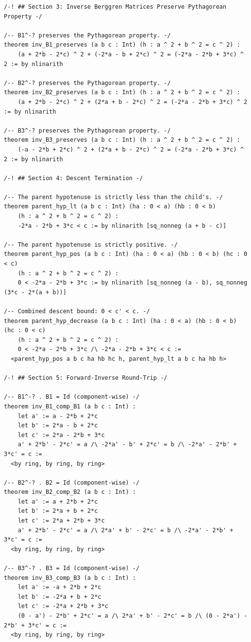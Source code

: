 \documentclass[11pt,twoside,openright]{book}
\theoremstyle{definition}
\theoremstyle{remark}
\begin{document}
\begin{lstlisting}[style=lean]
/-! ## Section 3: Inverse Berggren Matrices Preserve Pythagorean Property -/

/-- B1^-? preserves the Pythagorean property. -/
theorem inv_B1_preserves (a b c : Int) (h : a ^ 2 + b ^ 2 = c ^ 2) :
    (a + 2*b - 2*c) ^ 2 + (-2*a - b + 2*c) ^ 2 = (-2*a - 2*b + 3*c) ^ 2 := by nlinarith

/-- B2^-? preserves the Pythagorean property. -/
theorem inv_B2_preserves (a b c : Int) (h : a ^ 2 + b ^ 2 = c ^ 2) :
    (a + 2*b - 2*c) ^ 2 + (2*a + b - 2*c) ^ 2 = (-2*a - 2*b + 3*c) ^ 2 := by nlinarith

/-- B3^-? preserves the Pythagorean property. -/
theorem inv_B3_preserves (a b c : Int) (h : a ^ 2 + b ^ 2 = c ^ 2) :
    (-a - 2*b + 2*c) ^ 2 + (2*a + b - 2*c) ^ 2 = (-2*a - 2*b + 3*c) ^ 2 := by nlinarith

/-! ## Section 4: Descent Termination -/

/-- The parent hypotenuse is strictly less than the child's. -/
theorem parent_hyp_lt (a b c : Int) (ha : 0 < a) (hb : 0 < b)
    (h : a ^ 2 + b ^ 2 = c ^ 2) :
    -2*a - 2*b + 3*c < c := by nlinarith [sq_nonneg (a + b - c)]

/-- The parent hypotenuse is strictly positive. -/
theorem parent_hyp_pos (a b c : Int) (ha : 0 < a) (hb : 0 < b) (hc : 0 < c)
    (h : a ^ 2 + b ^ 2 = c ^ 2) :
    0 < -2*a - 2*b + 3*c := by nlinarith [sq_nonneg (a - b), sq_nonneg (3*c - 2*(a + b))]

/-- Combined descent bound: 0 < c' < c. -/
theorem parent_hyp_decrease (a b c : Int) (ha : 0 < a) (hb : 0 < b) (hc : 0 < c)
    (h : a ^ 2 + b ^ 2 = c ^ 2) :
    0 < -2*a - 2*b + 3*c /\ -2*a - 2*b + 3*c < c :=
  <parent_hyp_pos a b c ha hb hc h, parent_hyp_lt a b c ha hb h>

/-! ## Section 5: Forward-Inverse Round-Trip -/

/-- B1^-? . B1 = Id (component-wise) -/
theorem inv_B1_comp_B1 (a b c : Int) :
    let a' := a - 2*b + 2*c
    let b' := 2*a - b + 2*c
    let c' := 2*a - 2*b + 3*c
    a' + 2*b' - 2*c' = a /\ -2*a' - b' + 2*c' = b /\ -2*a' - 2*b' + 3*c' = c :=
  <by ring, by ring, by ring>

/-- B2^-? . B2 = Id (component-wise) -/
theorem inv_B2_comp_B2 (a b c : Int) :
    let a' := a + 2*b + 2*c
    let b' := 2*a + b + 2*c
    let c' := 2*a + 2*b + 3*c
    a' + 2*b' - 2*c' = a /\ 2*a' + b' - 2*c' = b /\ -2*a' - 2*b' + 3*c' = c :=
  <by ring, by ring, by ring>

/-- B3^-? . B3 = Id (component-wise) -/
theorem inv_B3_comp_B3 (a b c : Int) :
    let a' := -a + 2*b + 2*c
    let b' := -2*a + b + 2*c
    let c' := -2*a + 2*b + 3*c
    (0 - a') - 2*b' + 2*c' = a /\ 2*a' + b' - 2*c' = b /\ (0 - 2*a') - 2*b' + 3*c' = c :=
  <by ring, by ring, by ring>


\end{lstlisting}
\end{document}
